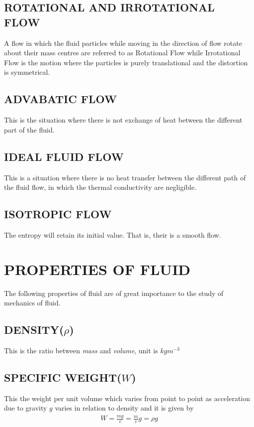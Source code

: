 \documentclass[11pt]{report}
\newcommand{\tti}[1]{\textit{#1}}
\begin{document}
	\subsection{ROTATIONAL AND IRROTATIONAL FLOW}
	A flow in which the fluid particles while moving in the direction of flow rotate about their mass centres are referred to as Rotational Flow while Irrotational Flow is the motion where the particles is purely translational and the distortion is symmetrical.
	
	\subsection{ADVABATIC FLOW}
	This is the situation where there is not exchange of heat between the different part of the fluid.
	
	\subsection{IDEAL FLUID FLOW}
	This is a situation where there is no heat transfer between the different path of the fluid flow, in which the thermal conductivity are negligible.
	
	\subsection{ISOTROPIC FLOW}
	The entropy will retain its initial value. That is, their is a smooth flow. 
	
	\section{PROPERTIES OF FLUID}
	The following properties of fluid are of great importance to the study of mechanics of fluid.
	
	\subsection{DENSITY($\rho$)}
	This is the ratio between \tti{mass} and \tti{volume}, unit is $kgm^{-3}$
	
	\subsection{SPECIFIC WEIGHT($W$)}
	This the weight per unit volume which varies from point to point as acceleration due to gravity $g$ varies in relation to density and it is given by
	\begin{eqnarray*}
		W = \frac{mg}{v} = \frac{m}{v}g = \rho g
	\end{eqnarray*}
	
\end{document}
